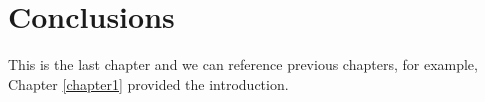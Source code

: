 \chapter{Conclusions} \label{chapter4}

This is the last chapter and we can reference previous chapters, for example,
Chapter \ref{chapter1} provided the introduction.


